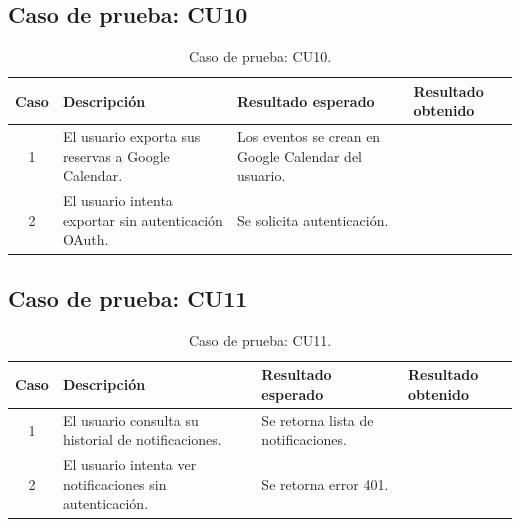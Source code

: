 
\subsection{Caso de prueba: CU10}

\begin{table}[H]
\centering
\label{tab:cu10_white_test}
\renewcommand{\arraystretch}{1.3}
\begin{tabular}{|c|p{5cm}|p{6cm}|p{2.5cm}|}
\hline
\rowcolor[RGB]{217,217,217}
\textbf{Caso} & \textbf{Descripción} & \textbf{Resultado esperado} & \textbf{Resultado obtenido} \\
\hline

1 &
El usuario exporta sus reservas a Google Calendar. &
Los eventos se crean en Google Calendar del usuario. &
 \\
\hline

2 &
El usuario intenta exportar sin autenticación OAuth. &
Se solicita autenticación. &
 \\
\hline

\end{tabular}
\caption{Caso de prueba: CU10.}
\end{table}


\subsection{Caso de prueba: CU11}

\begin{table}[H]
\centering
\label{tab:cu11_white_test}
\renewcommand{\arraystretch}{1.3}
\begin{tabular}{|c|p{5cm}|p{6cm}|p{2.5cm}|}
\hline
\rowcolor[RGB]{217,217,217}
\textbf{Caso} & \textbf{Descripción} & \textbf{Resultado esperado} & \textbf{Resultado obtenido} \\
\hline

1 &
El usuario consulta su historial de notificaciones. &
Se retorna lista de notificaciones. &
 \\
\hline

2 &
El usuario intenta ver notificaciones sin autenticación. &
Se retorna error 401. &
 \\
\hline

\end{tabular}
\caption{Caso de prueba: CU11.}
\end{table}

